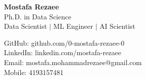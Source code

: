 \documentclass[11pt]{article} %
\begin{document}
\begin{center}
	\begin{minipage}{0.45\textwidth}
		{\Huge\bfseries
			Mostafa Rezaee  %
		} \\ \medskip
		Ph.D. in Data Science \\ %
		Data Scientist $|$ ML Engineer $|$ AI Scientist 
	\end{minipage} \hfill
	\begin{minipage}{0.48\textwidth}
		GitHub: github.com/0-mostafa-rezaee-0 \\
		LinkedIn: linkedin.com/mostafa-rezaee \\
		Email: mostafa.mohammadrezaee@gmail.com \\
		Mobile: 4193157481
	\end{minipage}
\end{center}

\end{document}
